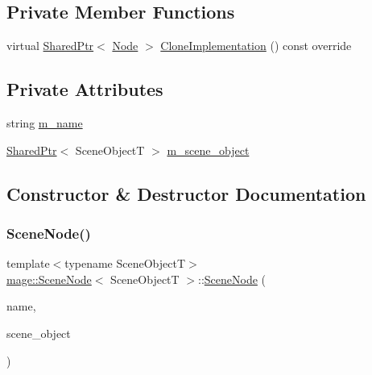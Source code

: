 \subsection*{Private Member Functions}
\begin{DoxyCompactItemize}
\item 
virtual \hyperlink{namespacemage_a1e01ae66713838a7a67d30e44c67703e}{Shared\+Ptr}$<$ \hyperlink{classmage_1_1_node}{Node} $>$ \hyperlink{classmage_1_1_scene_node_acbbf6e621375c1630b0e1e5ca35e4aec}{Clone\+Implementation} () const override
\end{DoxyCompactItemize}
\subsection*{Private Attributes}
\begin{DoxyCompactItemize}
\item 
string \hyperlink{classmage_1_1_scene_node_a210a40aa88e7c21d4b506ff78581eb2f}{m\+\_\+name}
\item 
\hyperlink{namespacemage_a1e01ae66713838a7a67d30e44c67703e}{Shared\+Ptr}$<$ Scene\+ObjectT $>$ \hyperlink{classmage_1_1_scene_node_aa05fbcdeb18d75170a5d5af70de995a9}{m\+\_\+scene\+\_\+object}
\end{DoxyCompactItemize}


\subsection{Constructor \& Destructor Documentation}
\hypertarget{classmage_1_1_scene_node_afef93aec34dc43e60c18eaf1d89864be}{}\label{classmage_1_1_scene_node_afef93aec34dc43e60c18eaf1d89864be} 
\subsubsection{\texorpdfstring{Scene\+Node()}{SceneNode()}\hspace{0.1cm}{\footnotesize\ttfamily [1/3]}}
{\footnotesize\ttfamily template$<$typename Scene\+ObjectT$>$ \\
\hyperlink{classmage_1_1_scene_node}{mage\+::\+Scene\+Node}$<$ Scene\+ObjectT $>$\+::\hyperlink{classmage_1_1_scene_node}{Scene\+Node} (\begin{DoxyParamCaption}\item[{const string \&}]{name,  }\item[{\hyperlink{namespacemage_a1e01ae66713838a7a67d30e44c67703e}{Shared\+Ptr}$<$ Scene\+ObjectT $>$}]{scene\+\_\+object }\end{DoxyParamCaption})\hspace{0.3cm}{\ttfamily [explicit]}}

